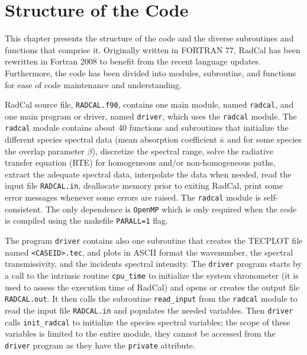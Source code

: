 

\chapter{Structure of the Code}
\label{chap:Code}
This chapter presents the structure of the code and the diverse subroutines and functions that comprise it. Originally written in FORTRAN 77, RadCal has been rewritten in Fortran 2008 to benefit from the recent language updates. Furthermore, the code has been divided into modules, subroutine, and functions for ease of code maintenance and understanding.


RadCal source file, \verb=RADCAL.f90=, contains one main module, named \verb=radcal=, and one main program or driver, named \verb=driver=, which uses the \verb=radcal= module. The \verb=radcal= module contains about 40 functions and subroutines that initialize the different species spectral data (mean absorption coefficient $\bar{\kappa}$ and for some species the overlap parameter $\beta$), discretize the spectral range, solve the radiative transfer equation (RTE) for homogeneous and/or non-homogeneous paths, extract the adequate spectral data, interpolate the data when needed, read the input file \verb=RADCAL.in=, deallocate memory prior to exiting RadCal, print some error messages whenever some errors are raised. The \verb=radcal= module is self-consistent. The only dependence is \verb=OpenMP= which is only required when the code is compiled using the makefile \verb-PARALL=1- flag.


The program \verb=driver= contains also one subroutine that creates the TECPLOT file named \verb=<CASEID>.tec=, and plots in ASCII format the wavenumber, the spectral transmissivity, and the incidents spectral intensity. The \verb=driver= program starts by a call to the intrinsic routine \verb=cpu_time= to initialize the system chronometer (it is used to assess the execution time of RadCal) and opens or creates the output file \verb=RADCAL.out=. It then calls the subroutine \verb=read_input= from the \verb=radcal= module to read the input file \verb=RADCAL.in= and populates the needed variables. Then \verb=driver= calls \verb=init_radcal= to initialize the species spectral variables; the scope of these variables is limited to the entire module, they cannot be accessed from the \verb=driver= program as they have the \verb=private= attribute.


